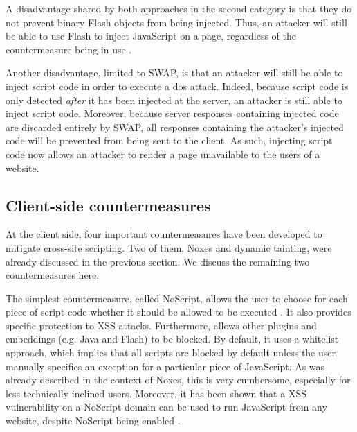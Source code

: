 A disadvantage shared by both approaches in the second category is that they do not prevent binary Flash objects from being injected. Thus, an attacker will still be able to use Flash to inject JavaScript on a page, regardless of the countermeasure being in use \cite{Bisht2008,FlashJSattack}.

Another disadvantage, limited to SWAP, is that an attacker will still be able to inject script code in order to execute a \gls{dos} attack. Indeed, because script code is only detected \emph{after} it has been injected at the server, an attacker is still able to inject script code. Moreover, because server responses containing injected code are discarded entirely by SWAP, all responses containing the attacker's injected code will be prevented from being sent to the client. As such, injecting script code now allows an attacker to render a page unavailable to the users of a website.

\subsection{Client-side countermeasures}

At the client side, four important countermeasures have been developed to mitigate cross-site scripting. Two of them, Noxes and dynamic tainting, were already discussed in the previous section. We discuss the remaining two countermeasures here.

The simplest countermeasure, called NoScript, allows the user to choose for each piece of script code whether it should be allowed to be executed \cite{NoScript}. It also provides specific protection to XSS attacks. Furthermore, allows other plugins and embeddings (e.g. Java and Flash) to be blocked. By default, it uses a whitelist approach, which implies that all scripts are blocked by default unless the user manually specifies an exception for a particular piece of JavaScript. As was already described in the context of Noxes, this is very cumbersome, especially for less technically inclined users. Moreover, it has been shown that a XSS vulnerability on a NoScript domain can be used to run JavaScript from any website, despite NoScript being enabled \cite{NoScriptCriticism}.

